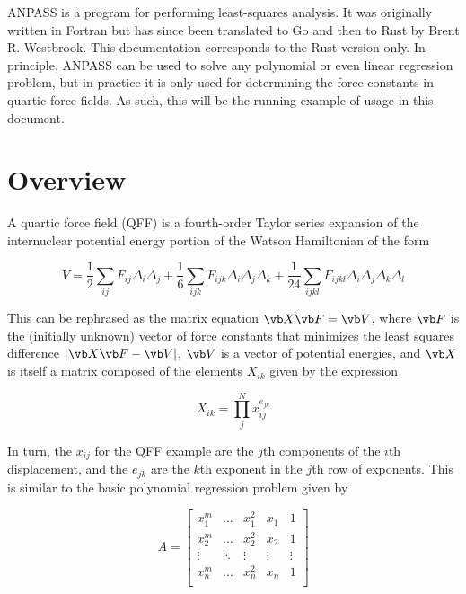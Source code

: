 \documentclass{article}
\begin{document}
ANPASS is a program for performing least-squares analysis. It was originally
written in Fortran but has since been translated to Go and then to Rust by Brent
R. Westbrook. This documentation corresponds to the Rust version only. In
principle, ANPASS can be used to solve any polynomial or even linear regression
problem, but in practice it is only used for determining the force constants in
quartic force fields. As such, this will be the running example of usage in this
document.

\section{Overview}
\label{sec:over}

A quartic force field (QFF) is a fourth-order Taylor series expansion of the
internuclear potential energy portion of the Watson Hamiltonian of the form

\begin{equation}
  V = \frac{1}{2}\sum_{ij} F_{ij}\Delta_i\Delta_j +
  \frac{1}{6}\sum_{ijk} F_{ijk}\Delta_i\Delta_j \Delta_k+
  \frac{1}{24}\sum_{ijkl} F_{ijkl}\Delta_i\Delta_j\Delta_k\Delta_l
\end{equation}

This can be rephrased as the matrix equation $\vb X \vb F= \vb V$, where $\vb F$
is the (initially unknown) vector of force constants that minimizes the least
squares difference $|\vb X \vb F - \vb V|$, $\vb V$ is a vector of potential
energies, and $\vb X$ is itself a matrix composed of the elements $X_{ik}$ given
by the expression

\begin{equation}
  X_{ik} = \prod_j^N x_{ij}^{e_{jk}}
\end{equation}

In turn, the $x_{ij}$ for the QFF example are the $j$th components of the $i$th
displacement, and the $e_{jk}$ are the $k$th exponent in the $j$th row of
exponents. This is similar to the basic polynomial regression problem given by

\begin{equation}
  A =
  \begin{bmatrix}
    x_1^m & \dots & x_1^2 & x_1 & 1 \\
    x_2^m & \dots & x_2^2 & x_2 & 1 \\
    \vdots & \ddots & \vdots & \vdots & \vdots \\
    x_n^m & \dots & x_n^2 & x_n & 1 \\
  \end{bmatrix}
\end{equation}
\end{document}
